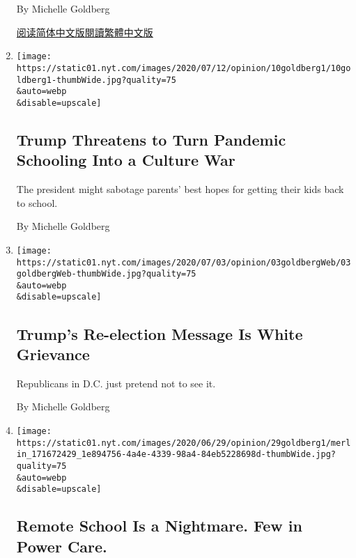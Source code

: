 \begin{enumerate}
  By Michelle Goldberg

  \href{https://cn.nytimes.com/opinion/20200714/us-coronavirus-trump/}{阅读简体中文版}\href{https://cn.nytimes.com/opinion/20200714/us-coronavirus-trump/zh-hant/}{閱讀繁體中文版}
\item
  \href{/2020/07/10/opinion/sunday/school-reopenings-trump.html}{}

  \texttt{[image: https://static01.nyt.com/images/2020/07/12/opinion/10goldberg1/10goldberg1-thumbWide.jpg?quality=75\\\&auto=webp\\\&disable=upscale]}

  \hypertarget{trump-threatens-to-turn-pandemic-schooling-into-a-culture-war}{%
  \subsection{Trump Threatens to Turn Pandemic Schooling Into a Culture
  War}\label{trump-threatens-to-turn-pandemic-schooling-into-a-culture-war}}

  The president might sabotage parents' best hopes for getting their
  kids back to school.

  By Michelle Goldberg
\item
  \href{/2020/07/02/opinion/trump-racism-2020-election.html}{}

  \texttt{[image: https://static01.nyt.com/images/2020/07/03/opinion/03goldbergWeb/03goldbergWeb-thumbWide.jpg?quality=75\\\&auto=webp\\\&disable=upscale]}

  \hypertarget{trumps-re-election-message-is-white-grievance}{%
  \subsection{Trump's Re-election Message Is White
  Grievance}\label{trumps-re-election-message-is-white-grievance}}

  Republicans in D.C. just pretend not to see it.

  By Michelle Goldberg
\item
  \href{/2020/06/29/opinion/coronavirus-school-reopening.html}{}

  \texttt{[image: https://static01.nyt.com/images/2020/06/29/opinion/29goldberg1/merlin\_171672429\_1e894756-4a4e-4339-98a4-84eb5228698d-thumbWide.jpg?quality=75\\\&auto=webp\\\&disable=upscale]}

  \hypertarget{remote-school-is-a-nightmare-few-in-power-care}{%
  \subsection{Remote School Is a Nightmare. Few in Power
  Care.}\label{remote-school-is-a-nightmare-few-in-power-care}}


\end{enumerate}
